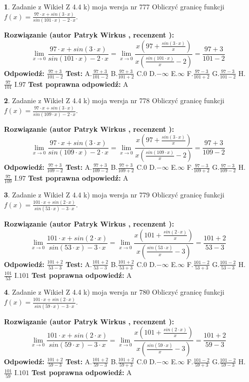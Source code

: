 \documentclass[12pt, a4paper]{article}
\theoremstyle{definition} %
\newtheorem{zad}{}
\newcommand{\zadStart}[1]{\begin{zad}#1\newline}
\newcommand{\zadStop}{\end{zad}}
\newcommand{\rozwStart}[2]{\noindent \textbf{Rozwiązanie (autor #1 , recenzent #2): }\newline}
\newcommand{\rozwStop}{\newline}
\newcommand{\odpStart}{\noindent \textbf{Odpowiedź:}\newline}
\newcommand{\odpStop}{\newline}
\newcommand{\testStart}{\noindent \textbf{Test:}\newline}
\newcommand{\testStop}{\newline}
\newcommand{\kluczStart}{\noindent \textbf{Test poprawna odpowiedź:}\newline}
\newcommand{\kluczStop}{\newline}
\begin{document}
\zadStart{Zadanie z Wikieł Z 4.4 k) moja wersja nr 777}
Obliczyć granicę funkcji $f(x)=\frac{97\cdot x +sin(3\cdot x)}{sin(101\cdot x) -2\cdot x}$.
\zadStop
\rozwStart{Patryk Wirkus}{}
$$\lim\limits_{x\to 0}\frac{97\cdot x +sin(3\cdot x)}{sin(101\cdot x) -2\cdot x}
=\lim\limits_{x\to 0}\frac{x(97+\frac{sin(3\cdot x)}{x})}{x(\frac{sin(101\cdot x)}{x}-2)}
=\frac{97+3}{101-2}$$
\rozwStop
\odpStart
$\frac{97+3}{101-2}$
\odpStop
\testStart
A.$\frac{97+3}{101-2}$
B.$\frac{97+3}{101+2}$
C.$0$
D.$-\infty$
E.$\infty$
F.$\frac{97-3}{101+2}$
G.$\frac{97-3}{101-2}$
H.$\frac{97}{101}$
I.$97$
\testStop
\kluczStart
A
\kluczStop



\zadStart{Zadanie z Wikieł Z 4.4 k) moja wersja nr 778}
Obliczyć granicę funkcji $f(x)=\frac{97\cdot x +sin(3\cdot x)}{sin(109\cdot x) -2\cdot x}$.
\zadStop
\rozwStart{Patryk Wirkus}{}
$$\lim\limits_{x\to 0}\frac{97\cdot x +sin(3\cdot x)}{sin(109\cdot x) -2\cdot x}
=\lim\limits_{x\to 0}\frac{x(97+\frac{sin(3\cdot x)}{x})}{x(\frac{sin(109\cdot x)}{x}-2)}
=\frac{97+3}{109-2}$$
\rozwStop
\odpStart
$\frac{97+3}{109-2}$
\odpStop
\testStart
A.$\frac{97+3}{109-2}$
B.$\frac{97+3}{109+2}$
C.$0$
D.$-\infty$
E.$\infty$
F.$\frac{97-3}{109+2}$
G.$\frac{97-3}{109-2}$
H.$\frac{97}{109}$
I.$97$
\testStop
\kluczStart
A
\kluczStop



\zadStart{Zadanie z Wikieł Z 4.4 k) moja wersja nr 779}
Obliczyć granicę funkcji $f(x)=\frac{101\cdot x +sin(2\cdot x)}{sin(53\cdot x) -3\cdot x}$.
\zadStop
\rozwStart{Patryk Wirkus}{}
$$\lim\limits_{x\to 0}\frac{101\cdot x +sin(2\cdot x)}{sin(53\cdot x) -3\cdot x}
=\lim\limits_{x\to 0}\frac{x(101+\frac{sin(2\cdot x)}{x})}{x(\frac{sin(53\cdot x)}{x}-3)}
=\frac{101+2}{53-3}$$
\rozwStop
\odpStart
$\frac{101+2}{53-3}$
\odpStop
\testStart
A.$\frac{101+2}{53-3}$
B.$\frac{101+2}{53+3}$
C.$0$
D.$-\infty$
E.$\infty$
F.$\frac{101-2}{53+3}$
G.$\frac{101-2}{53-3}$
H.$\frac{101}{53}$
I.$101$
\testStop
\kluczStart
A
\kluczStop



\zadStart{Zadanie z Wikieł Z 4.4 k) moja wersja nr 780}
Obliczyć granicę funkcji $f(x)=\frac{101\cdot x +sin(2\cdot x)}{sin(59\cdot x) -3\cdot x}$.
\zadStop
\rozwStart{Patryk Wirkus}{}
$$\lim\limits_{x\to 0}\frac{101\cdot x +sin(2\cdot x)}{sin(59\cdot x) -3\cdot x}
=\lim\limits_{x\to 0}\frac{x(101+\frac{sin(2\cdot x)}{x})}{x(\frac{sin(59\cdot x)}{x}-3)}
=\frac{101+2}{59-3}$$
\rozwStop
\odpStart
$\frac{101+2}{59-3}$
\odpStop
\testStart
A.$\frac{101+2}{59-3}$
B.$\frac{101+2}{59+3}$
C.$0$
D.$-\infty$
E.$\infty$
F.$\frac{101-2}{59+3}$
G.$\frac{101-2}{59-3}$
H.$\frac{101}{59}$
I.$101$
\testStop
\kluczStart
A
\kluczStop
\end{document}
